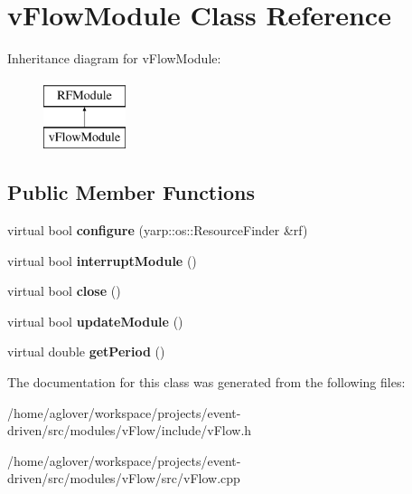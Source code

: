 \hypertarget{classvFlowModule}{}\section{v\+Flow\+Module Class Reference}
\label{classvFlowModule}
Inheritance diagram for v\+Flow\+Module\+:\begin{figure}[H]
\begin{center}
\leavevmode
\includegraphics[height=2.000000cm]{classvFlowModule}
\end{center}
\end{figure}
\subsection*{Public Member Functions}
\begin{DoxyCompactItemize}
\item 
virtual bool {\bfseries configure} (yarp\+::os\+::\+Resource\+Finder \&rf)\hypertarget{classvFlowModule_a5cf91bc0de9e311b1946c6ec044fd947}{}\label{classvFlowModule_a5cf91bc0de9e311b1946c6ec044fd947}

\item 
virtual bool {\bfseries interrupt\+Module} ()\hypertarget{classvFlowModule_a49a90a2d595d99bf290423dd930eefe2}{}\label{classvFlowModule_a49a90a2d595d99bf290423dd930eefe2}

\item 
virtual bool {\bfseries close} ()\hypertarget{classvFlowModule_a63a3da2ac7ba9631753ea244d8bc4358}{}\label{classvFlowModule_a63a3da2ac7ba9631753ea244d8bc4358}

\item 
virtual bool {\bfseries update\+Module} ()\hypertarget{classvFlowModule_a880de21f5c85d684f7c0999d0a84e26b}{}\label{classvFlowModule_a880de21f5c85d684f7c0999d0a84e26b}

\item 
virtual double {\bfseries get\+Period} ()\hypertarget{classvFlowModule_a8f6f74c4a7888e162c2dff8a34a84323}{}\label{classvFlowModule_a8f6f74c4a7888e162c2dff8a34a84323}

\end{DoxyCompactItemize}


The documentation for this class was generated from the following files\+:\begin{DoxyCompactItemize}
\item 
/home/aglover/workspace/projects/event-\/driven/src/modules/v\+Flow/include/v\+Flow.\+h\item 
/home/aglover/workspace/projects/event-\/driven/src/modules/v\+Flow/src/v\+Flow.\+cpp\end{DoxyCompactItemize}
